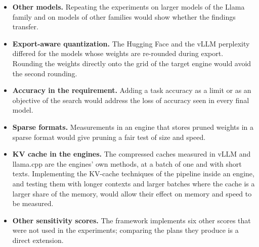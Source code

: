 \documentclass[
11pt, %
english, %
singlespacing, %
headsepline, %
]{MastersDoctoralThesis} %
\begin{document}
\begin{itemize}
  \item \textbf{Other models.} Repeating the experiments on larger models of the Llama family and on models of other families would show whether the findings transfer.
  \item \textbf{Export-aware quantization.} The Hugging Face and the vLLM perplexity differed for the models whose weights are re-rounded during export. Rounding the weights directly onto the grid of the target engine would avoid the second rounding.
  \item \textbf{Accuracy in the requirement.} Adding a task accuracy as a limit or as an objective of the search would address the loss of accuracy seen in every final model.
  \item \textbf{Sparse formats.} Measurements in an engine that stores pruned weights in a sparse format would give pruning a fair test of size and speed.
  \item \textbf{KV cache in the engines.} The compressed caches measured in vLLM and llama.cpp are the engines' own methods, at a batch of one and with short texts. Implementing the KV-cache techniques of the pipeline inside an engine, and testing them with longer contexts and larger batches where the cache is a larger share of the memory, would allow their effect on memory and speed to be measured.
  \item \textbf{Other sensitivity scores.} The framework implements six other scores that were not used in the experiments; comparing the plans they produce is a direct extension.
\end{itemize}
\clearpage
%
%



\appendix %


\clearpage
\clearpage
%
%

\printbibliography



\end{document}
